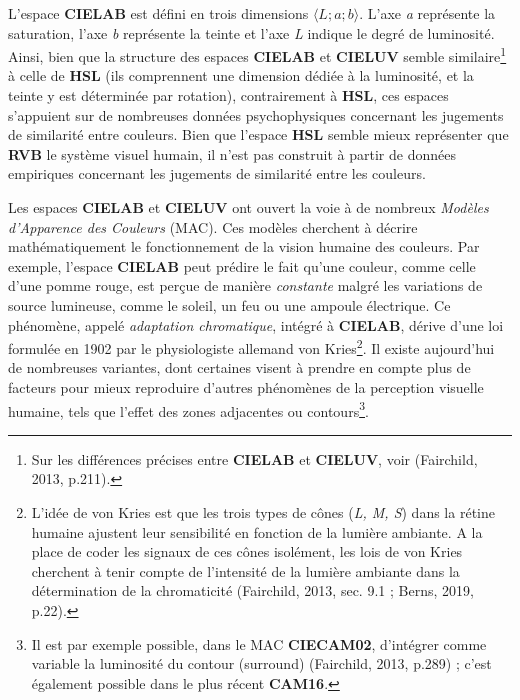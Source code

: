 \documentclass{article}
\begin{document}
L'espace \textbf{CIELAB} est défini en trois dimensions $\langle L ; a ; b \rangle$. L'axe \textit{a} représente la saturation, l'axe \textit{b} représente la teinte et l'axe \textit{L} indique le degré de luminosité. Ainsi, bien que la structure des espaces \textbf{CIELAB} et \textbf{CIELUV} semble similaire\footnote{Sur les différences précises entre \textbf{CIELAB} et \textbf{CIELUV}, voir (Fairchild, 2013, p.211).} à celle de \textbf{HSL} (ils comprennent une dimension dédiée à la luminosité, et la teinte y est déterminée par rotation), contrairement à \textbf{HSL}, ces espaces s’appuient sur de nombreuses données psychophysiques concernant les jugements de similarité entre couleurs. Bien que l’espace \textbf{HSL} semble mieux représenter que \textbf{RVB} le système visuel humain, il n’est pas construit à partir de données empiriques concernant les jugements de similarité entre les couleurs.
\par
Les espaces \textbf{CIELAB} et \textbf{CIELUV} ont ouvert la voie à de nombreux \textit{Modèles d’Apparence des Couleurs} (MAC). Ces modèles cherchent à décrire mathématiquement le fonctionnement de la vision humaine des couleurs. Par exemple, l’espace \textbf{CIELAB} peut prédire le fait qu'une couleur, comme celle d'une pomme rouge, est perçue de manière \textit{constante} malgré les variations de source lumineuse, comme le soleil, un feu ou une ampoule électrique. Ce phénomène, appelé \textit{adaptation chromatique}, intégré à \textbf{CIELAB}, dérive d’une loi formulée en 1902 par le physiologiste allemand von Kries\footnote{L’idée de von Kries est que les trois types de cônes (\textit{L, M, S}) dans la rétine humaine ajustent leur sensibilité en fonction de la lumière ambiante. A la place de coder les signaux de ces cônes isolément, les lois de von Kries cherchent à tenir compte de l’intensité de la lumière ambiante dans la détermination de la chromaticité (Fairchild, 2013, sec. 9.1 ; Berns, 2019, p.22).}. Il existe aujourd’hui de nombreuses variantes, dont certaines visent à prendre en compte plus de facteurs pour mieux reproduire d’autres phénomènes de la perception visuelle humaine, tels que l’effet des zones adjacentes ou contours\footnote{Il est par exemple possible, dans le MAC \textbf{CIECAM02}, d’intégrer comme variable la luminosité du contour (surround) (Fairchild, 2013, p.289) ; c’est également possible dans le plus récent \textbf{CAM16}. }.
\par
\end{document}
